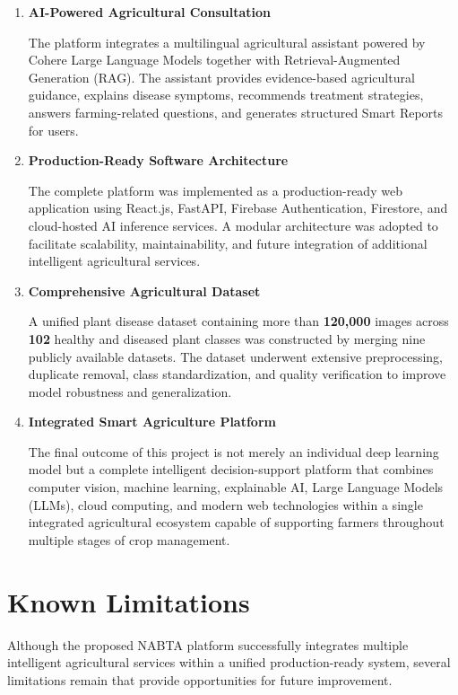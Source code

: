 \begin{enumerate}[leftmargin=*,label=\textbf{A\arabic*.}]
\item \textbf{AI-Powered Agricultural Consultation}

The platform integrates a multilingual agricultural assistant powered by Cohere Large Language Models together with Retrieval-Augmented Generation (RAG). The assistant provides evidence-based agricultural guidance, explains disease symptoms, recommends treatment strategies, answers farming-related questions, and generates structured Smart Reports for users.

\item \textbf{Production-Ready Software Architecture}

The complete platform was implemented as a production-ready web application using React.js, FastAPI, Firebase Authentication, Firestore, and cloud-hosted AI inference services. A modular architecture was adopted to facilitate scalability, maintainability, and future integration of additional intelligent agricultural services.

\item \textbf{Comprehensive Agricultural Dataset}

A unified plant disease dataset containing more than \textbf{120,000} images across \textbf{102} healthy and diseased plant classes was constructed by merging nine publicly available datasets. The dataset underwent extensive preprocessing, duplicate removal, class standardization, and quality verification to improve model robustness and generalization.

\item \textbf{Integrated Smart Agriculture Platform}

The final outcome of this project is not merely an individual deep learning model but a complete intelligent decision-support platform that combines computer vision, machine learning, explainable AI, Large Language Models (LLMs), cloud computing, and modern web technologies within a single integrated agricultural ecosystem capable of supporting farmers throughout multiple stages of crop management.

\end{enumerate}

\section{Known Limitations}
\label{sec:limitations}

Although the proposed NABTA platform successfully integrates multiple intelligent agricultural services within a unified production-ready system, several limitations remain that provide opportunities for future improvement.

